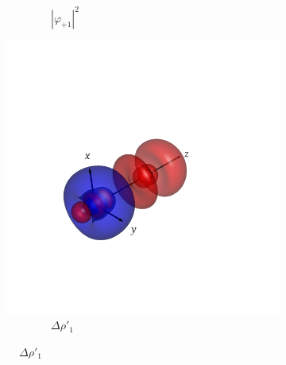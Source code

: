 \documentclass[journal=inoraj,manuscript=article]{achemso}
\begin{document}
\begin{figure}[!h]
\begin{subfigure}[t]{0.32\textwidth}
        \caption*{\ \ \ \ \ \ \ \ $|\varphi_{+1}|^2$} 
    \end{subfigure}
    \hfill
    \begin{subfigure}[t]{0.32\textwidth}
        \centering
        \includegraphics[width=\linewidth]{./AuOg+/pair1.png} 
        \caption*{\ \ \ \ \ \ \ \ $\Delta \rho'_1$} 
    \end{subfigure}


\end{figure}
\end{document}
